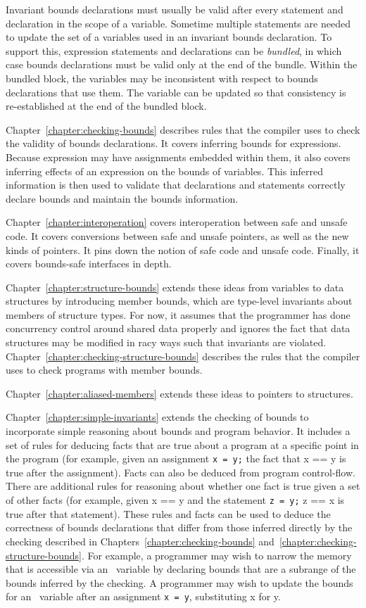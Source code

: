 Invariant bounds declarations must usually be valid after every
statement and declaration in the scope of a variable. Sometime multiple
statements are needed to update the set of a variables used in an
invariant bounds declaration. To support this, expression statements and
declarations can be \emph{bundled}, in which case bounds declarations
must be valid only at the end of the bundle. Within the bundled block,
the variables may be inconsistent with respect to bounds declarations
that use them. The variable can be updated so that consistency is
re-established at the end of the bundled block.

Chapter~\ref{chapter:checking-bounds} describes rules that the compiler uses to check the validity
of bounds declarations. It covers inferring bounds for expressions.
Because expression may have assignments embedded within them, it also
covers inferring effects of an expression on the bounds of variables.
This inferred information is then used to validate that declarations and
statements correctly declare bounds and maintain the bounds information.

Chapter~\ref{chapter:interoperation} covers interoperation between 
safe and unsafe code. It covers
conversions between safe and unsafe pointers, as well as the new kinds
of pointers. It pins down the notion of safe code and unsafe code.
Finally, it covers bounds-safe interfaces in depth.

Chapter~\ref{chapter:structure-bounds} extends these ideas from variables to data 
structures by
introducing member bounds, which are type-level invariants about members
of structure types. For now, it assumes that the programmer has done
concurrency control around shared data properly and ignores the fact
that data structures may be modified in racy ways such that invariants
are violated.  Chapter~\ref{chapter:checking-structure-bounds} describes
the rules that the compiler uses to check programs with member bounds.

Chapter~\ref{chapter:aliased-members} extends these ideas to pointers 
to structures.

Chapter~\ref{chapter:simple-invariants}
extends the checking of bounds to incorporate simple
reasoning about bounds and program behavior. It includes a set of rules
for deducing facts that are true about a program at a specific point in
the program (for example, given an assignment \texttt{x = y;} the fact
that x == y is true after the assignment). Facts can also be deduced
from program control-flow. There are additional rules for reasoning
about whether one fact is true given a set of other facts (for example,
given x == y and the statement \texttt{z = y;} z == x is true after that
statement). These rules and facts can be used to deduce the correctness
of bounds declarations that differ from those inferred directly by the
checking described in Chapters~\ref{chapter:checking-bounds} 
and~\ref{chapter:checking-structure-bounds}. For example, a programmer
may wish to narrow the memory that is accessible via an
\arrayptr\ variable by declaring bounds that are a subrange of
the bounds inferred by the checking. A programmer may wish to update the
bounds for an \arrayptr\ variable after an assignment \texttt{x
= y}, substituting x for y.

